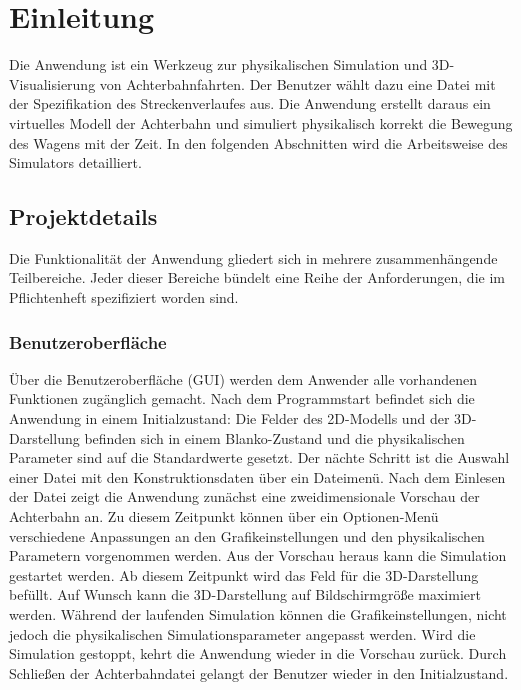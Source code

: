 
\chapter{Einleitung}

Die Anwendung ist ein Werkzeug zur physikalischen Simulation und 3D-Visualisierung von Achterbahnfahrten.
Der Benutzer wählt dazu eine Datei mit der Spezifikation des Streckenverlaufes aus. Die Anwendung erstellt 
daraus ein virtuelles Modell der Achterbahn und simuliert physikalisch korrekt die Bewegung des Wagens mit
der Zeit. In den folgenden Abschnitten wird die Arbeitsweise des Simulators detailliert.

\section{Projektdetails}
Die Funktionalität der Anwendung gliedert sich in mehrere zusammenhängende Teilbereiche. Jeder dieser
Bereiche bündelt eine Reihe der Anforderungen, die im Pflichtenheft spezifiziert worden sind.

\subsection{Benutzeroberfläche}
Über die Benutzeroberfläche (GUI) werden dem Anwender alle vorhandenen Funktionen zugänglich gemacht.
Nach dem Programmstart befindet sich die Anwendung in einem Initialzustand: Die Felder des 2D-Modells
und der 3D-Darstellung befinden sich in einem Blanko-Zustand und die physikalischen Parameter sind
auf die Standardwerte gesetzt. Der nächte Schritt ist die Auswahl einer Datei mit den Konstruktionsdaten
über ein Dateimenü. Nach dem Einlesen der Datei zeigt die Anwendung zunächst eine zweidimensionale 
Vorschau der Achterbahn an. Zu diesem Zeitpunkt können über ein Optionen-Menü verschiedene Anpassungen 
an den Grafikeinstellungen und den physikalischen Parametern vorgenommen werden. 
Aus der Vorschau heraus kann die Simulation gestartet werden. Ab diesem Zeitpunkt wird das Feld für 
die 3D-Darstellung befüllt. Auf Wunsch kann die 3D-Darstellung auf Bildschirmgröße
maximiert werden. Während der laufenden Simulation können die Grafikeinstellungen, nicht jedoch
die physikalischen Simulationsparameter angepasst werden. Wird die Simulation gestoppt, kehrt die Anwendung
wieder in die Vorschau zurück. Durch Schließen der Achterbahndatei gelangt der Benutzer wieder in den 
Initialzustand.

